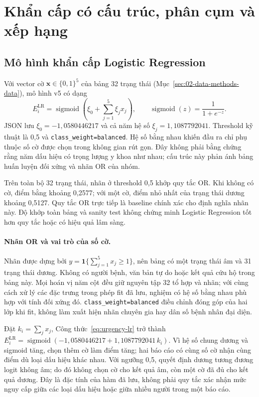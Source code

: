 \section{Khẩn cấp có cấu trúc, phân cụm và xếp hạng}\label{sec:02-data-methods-methods}
\subsection{Mô hình khẩn cấp Logistic Regression}\label{sec:02-urgency-lr}
Với vector cờ $\symbf{x}\in\{0,1\}^{5}$ của bảng 32 trạng thái (Mục~\ref{sec:02-data-methods-data}), mô hình v5 có dạng
\begin{equation}
 E_i^{\mathrm{LR}}=\operatorname{sigmoid}\!\left(\xi_0+\sum_{j=1}^{5}\xi_jx_j\right),
 \qquad \operatorname{sigmoid}(z)=\frac{1}{1+e^{-z}}.
 \label{eq:urgency-lr}
\end{equation}
JSON lưu $\xi_0=-1{,}0580446217$ và cả năm hệ số $\xi_j=1{,}1087792041$. Threshold kỹ thuật là 0,5 và \texttt{class\_weight=balanced}. Hệ số bằng nhau khiến đầu ra chỉ phụ thuộc số cờ được chọn trong không gian rút gọn. Đây không phải bằng chứng rằng năm dấu hiệu có trọng lượng y khoa như nhau; cấu trúc này phản ánh bảng huấn luyện đối xứng và nhãn OR của nhóm.

Trên toàn bộ 32 trạng thái, nhãn ở threshold 0,5 khớp quy tắc OR. Khi không có cờ, điểm bằng khoảng 0,2577; với một cờ, điểm nhỏ nhất của trạng thái dương khoảng 0,5127. Quy tắc OR trực tiếp là baseline chính xác cho định nghĩa nhãn này. Độ khớp toàn bảng và sanity test không chứng minh Logistic Regression tốt hơn quy tắc hoặc có hiệu quả lâm sàng.

\paragraph{Nhãn OR và vai trò của số cờ.} Nhãn được dựng bởi $y=\mathbf{1}\{\sum_{j=1}^{5}x_j\geq1\}$, nên bảng có một trạng thái âm và 31 trạng thái dương. Không có người bệnh, văn bản tự do hoặc kết quả cứu hộ trong bảng này. Mọi hoán vị năm cột đều giữ nguyên tập 32 tổ hợp và nhãn; với cùng cách xử lý các đặc trưng trong phép fit đã lưu, nghiệm có hệ số bằng nhau phù hợp với tính đối xứng đó. \texttt{class\_weight=balanced} điều chỉnh đóng góp của hai lớp khi fit, không làm xuất hiện nhãn chuyên gia hay dân số bệnh nhân đại diện.

Đặt $k_i=\sum_jx_j$, Công thức~\ref{eq:urgency-lr} trở thành $E_i^{\mathrm{LR}}=\operatorname{sigmoid}(-1{,}0580446217+1{,}1087792041\,k_i)$. Vì hệ số chung dương và sigmoid tăng, chọn thêm cờ làm điểm tăng; hai báo cáo có cùng số cờ nhận cùng điểm dù loại dấu hiệu khác nhau. Với ngưỡng 0,5, quyết định dương tương đương logit không âm; do đó không chọn cờ cho kết quả âm, còn một cờ đã đủ cho kết quả dương. Đây là đặc tính của hàm đã lưu, không phải quy tắc xác nhận mức nguy cấp giữa các loại dấu hiệu hoặc giữa nhiều người trong một báo cáo.

